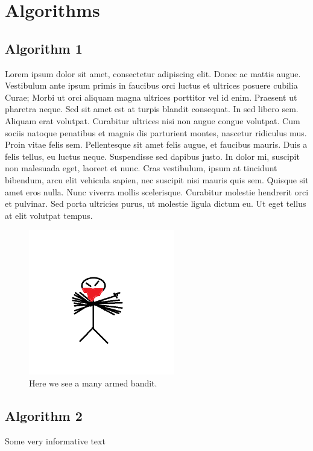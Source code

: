 \documentclass{article}
\begin{document}
\section{Algorithms}
\subsection{Algorithm 1}
Lorem ipsum dolor sit amet, consectetur adipiscing elit. Donec ac mattis augue. Vestibulum ante ipsum primis in faucibus orci luctus et ultrices posuere cubilia Curae; Morbi ut orci aliquam magna ultrices porttitor vel id enim. Praesent ut pharetra neque. Sed sit amet est at turpis blandit consequat. In sed libero sem. Aliquam erat volutpat. Curabitur ultrices nisi non augue congue volutpat. Cum sociis natoque penatibus et magnis dis parturient montes, nascetur ridiculus mus. Proin vitae felis sem. Pellentesque sit amet felis augue, et faucibus mauris. Duis a felis tellus, eu luctus neque. Suspendisse sed dapibus justo. In dolor mi, suscipit non malesuada eget, laoreet et nunc. Cras vestibulum, ipsum at tincidunt bibendum, arcu elit vehicula sapien, nec suscipit nisi mauris quis sem. Quisque sit amet eros nulla. Nunc viverra mollis scelerisque. Curabitur molestie hendrerit orci et pulvinar. Sed porta ultricies purus, ut molestie ligula dictum eu. Ut eget tellus at elit volutpat tempus. 

\begin{figure}
 \centering
 \includegraphics[width=240px]{./image.png}
 \caption{Here we see a many armed bandit.}
 \label{manyarms}
\end{figure}


\subsection{Algorithm 2}
Some very informative text
\end{document}
